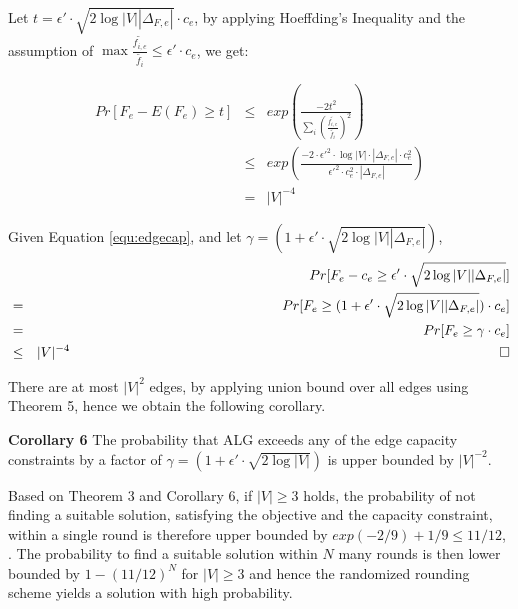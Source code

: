 \documentclass[conference]{IEEEtran}
\newcommand*{\QEDB}{\hfill\ensuremath{\square}}%
\begin{document}
Let $t=\epsilon' \cdot \sqrt{2\log|V||\Delta_{F,e}|} \cdot c_e$, by applying Hoeffding's Inequality and the assumption of $\max \frac{\tilde{f_{i,e}}}{\tilde{f_i}} \le \epsilon' \cdot c_e$, we get:

\begin{eqnarray}
Pr[F_e - E(F_e) \ge t] &\le& exp(\frac{-2t^2}{\sum_{i}(\frac{\tilde{f_{i,e}}}{\tilde{f_i}})^2}) \\ \nonumber
&\le& exp(\frac{-2 \cdot \epsilon'^2 \cdot \log|V| \cdot |\Delta_{F,e}| \cdot c_e^2}{\epsilon'^2 \cdot c_e^2 \cdot |\Delta_{F,e}|}) \\ \nonumber
&=& |V|^{-4}
\end{eqnarray}


Given Equation \ref{equ:edgecap}, and let $\gamma = (1+\epsilon' \cdot \sqrt{2\log|V||\Delta_{F,e}|})$,
\begin{eqnarray} \nonumber
&&Pr[F_e - c_e \ge \epsilon' \cdot \sqrt{2\log|V||\Delta_{F,e}|}] \\ \nonumber
&=& Pr[F_e \ge (1+\epsilon' \cdot \sqrt{2\log|V||\Delta_{F,e}|}) \cdot c_e] \\ \nonumber
&=& Pr[F_e \ge \gamma \cdot c_e] \\ \nonumber
&\le& |V|^{-4} \,\,\,\,\,\,\,\,\,\,\,\,\,\,\,\,\,\,\,\,\,\,\,\,\,\,\,\,\,\,\,\,\,\,\,\,\,\,\,\,\,\,\,\,\,\,\,\,\,\,\,\,\,\,\,\,\,\,\,\,\,\,\,\,\,\,\,\,\,\,\,\,\,\,\,\,\,\,\,\,\,\,\,\,\,\,\,\,\,\,\,\,\,\,\,\,\,\,\,\,\,\,\,\,\,\,\,\,\,\,\,\,\,\,\,\,\,\,\,\,\,\,\,\,\,\,\,\,\,\,\,\,\,\,\,\,\,\,\,\,\,\,\,\,\,\,\,\,\,\,\,\,\,\,\,\,\,\,\,\,\,\,\,\,\,\,\,\,\,\,\,\,\,\,\,\,\,\,\,\,\,\,\,\,\,\,\,\,\,\, \QEDB
\end{eqnarray}

%

There are at most $|V|^2$ edges, by applying union bound over all edges using Theorem 5, hence we obtain the following corollary.

\textbf{Corollary 6} The probability that ALG exceeds any of the edge capacity constraints by a factor of $\gamma = (1+\epsilon' \cdot \sqrt{2\log|V|})$ is upper bounded by $|V|^{-2}$.

Based on Theorem 3 and Corollary 6, if $|V| \ge 3$ holds, the probability of not finding a suitable solution, satisfying the objective and the capacity constraint, within a single round is therefore upper bounded by $exp(−2/9) + 1/9 \le 11/12$, . The probability to find a suitable solution within $N$ many rounds is then lower bounded by $1 - (11/12)^N$ for $|V| \ge 3$ and hence the randomized rounding scheme yields a solution with high probability. 
\end{document}
